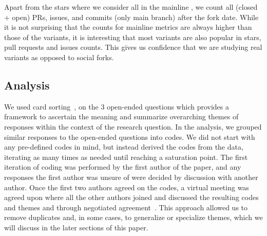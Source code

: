 Apart from the stars where we consider all in the mainline
, we count all (closed + open) PRs, issues, and commits (only main branch) after the fork date. While it is not surprising that the counts for mainline metrics are always higher than those of the variants, it is interesting that most variants are also popular in stars, pull requests and issues counts. This gives us confidence that we are studying real variants as opposed to social forks.


\subsection{Analysis}
\label{sec:card_sorting}


We used card sorting~\cite{zimmermann2016card}, on the 3 open-ended questions which provides a framework to ascertain the meaning and summarize overarching themes of responses within the context of the research question. In the analysis, we grouped similar responses to the open-ended questions into codes. We did not start with any pre-defined codes in mind, but instead derived the codes from the data, iterating as many times as needed until reaching a saturation point. The first iteration of coding was performed by the first author of the paper, and any responses the first author was unsure of were decided by discussion with another author. Once the first two authors agreed on the codes, a virtual meeting was agreed upon where all the other authors joined and discussed the resulting codes and themes and through negotiated agreement~\cite{Garrison:2006}. This approach allowed us to remove duplicates and, in some cases, to generalize or specialize themes, which we will discuss in the later sections of this paper.
